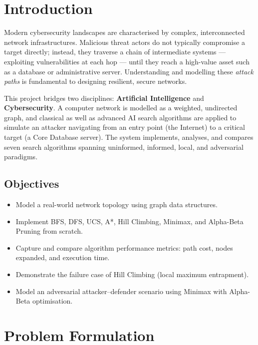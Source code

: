 \documentclass[12pt,a4paper]{article}
\begin{document}
\tableofcontents
\newpage

\section{Introduction}

Modern cybersecurity landscapes are characterised by complex, interconnected network
infrastructures. Malicious threat actors do not typically compromise a target directly;
instead, they traverse a chain of intermediate systems — exploiting vulnerabilities at
each hop — until they reach a high-value asset such as a database or administrative
server. Understanding and modelling these \textit{attack paths} is fundamental to
designing resilient, secure networks.

This project bridges two disciplines: \textbf{Artificial Intelligence} and
\textbf{Cybersecurity}. A computer network is modelled as a weighted, undirected graph,
and classical as well as advanced AI search algorithms are applied to simulate an
attacker navigating from an entry point (the Internet) to a critical target (a Core
Database server). The system implements, analyses, and compares seven search
algorithms spanning uninformed, informed, local, and adversarial paradigms.

\subsection{Objectives}
\begin{itemize}
    \item Model a real-world network topology using graph data structures.
    \item Implement BFS, DFS, UCS, A*, Hill Climbing, Minimax, and Alpha-Beta Pruning from scratch.
    \item Capture and compare algorithm performance metrics: path cost, nodes expanded, and execution time.
    \item Demonstrate the failure case of Hill Climbing (local maximum entrapment).
    \item Model an adversarial attacker--defender scenario using Minimax with Alpha-Beta optimisation.
\end{itemize}

\section{Problem Formulation}
\end{document}
